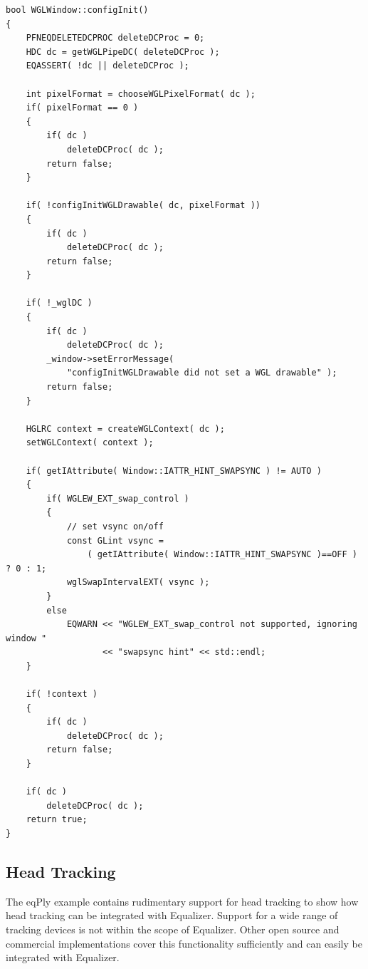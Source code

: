 \documentclass[10pt,a4]{scrartcl}
\begin{document}
{\footnotesize\begin{lstlisting}
bool WGLWindow::configInit()
{
    PFNEQDELETEDCPROC deleteDCProc = 0;
    HDC dc = getWGLPipeDC( deleteDCProc );
    EQASSERT( !dc || deleteDCProc );

    int pixelFormat = chooseWGLPixelFormat( dc );
    if( pixelFormat == 0 )
    {
        if( dc )
            deleteDCProc( dc );
        return false;
    }

    if( !configInitWGLDrawable( dc, pixelFormat ))
    {
        if( dc )
            deleteDCProc( dc );
        return false;
    }

    if( !_wglDC )
    {
        if( dc )
            deleteDCProc( dc );
        _window->setErrorMessage(
            "configInitWGLDrawable did not set a WGL drawable" );
        return false;
    }

    HGLRC context = createWGLContext( dc );
    setWGLContext( context );

    if( getIAttribute( Window::IATTR_HINT_SWAPSYNC ) != AUTO )
    {
        if( WGLEW_EXT_swap_control )
        {
            // set vsync on/off
            const GLint vsync = 
                ( getIAttribute( Window::IATTR_HINT_SWAPSYNC )==OFF ) ? 0 : 1;
            wglSwapIntervalEXT( vsync );
        }
        else
            EQWARN << "WGLEW_EXT_swap_control not supported, ignoring window "
                   << "swapsync hint" << std::endl;
    }

    if( !context )
    {
        if( dc )
            deleteDCProc( dc );
        return false;
    }

    if( dc )
        deleteDCProc( dc );
    return true;
}
\end{lstlisting}}%


\subsection{\label{sTracking}Head Tracking}

The \textsf{eqPly} example contains rudimentary support for head
tracking to show how head tracking can be integrated with
Equalizer. Support for a wide range of tracking devices is not within
the scope of Equalizer. Other open source and commercial implementations
cover this functionality sufficiently and can easily be integrated with
Equalizer.
\end{document}
